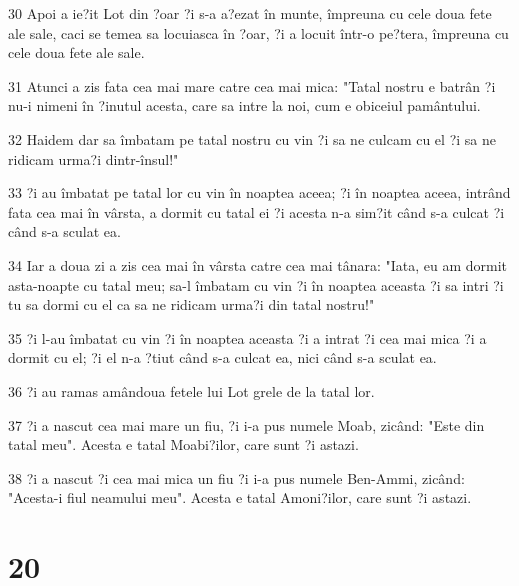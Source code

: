 \par 30 Apoi a ie?it Lot din ?oar ?i s-a a?ezat în munte, împreuna cu cele doua fete ale sale, caci se temea sa locuiasca în ?oar, ?i a locuit într-o pe?tera, împreuna cu cele doua fete ale sale.
\par 31 Atunci a zis fata cea mai mare catre cea mai mica: "Tatal nostru e batrân ?i nu-i nimeni în ?inutul acesta, care sa intre la noi, cum e obiceiul pamântului.
\par 32 Haidem dar sa îmbatam pe tatal nostru cu vin ?i sa ne culcam cu el ?i sa ne ridicam urma?i dintr-însul!"
\par 33 ?i au îmbatat pe tatal lor cu vin în noaptea aceea; ?i în noaptea aceea, intrând fata cea mai în vârsta, a dormit cu tatal ei ?i acesta n-a sim?it când s-a culcat ?i când s-a sculat ea.
\par 34 Iar a doua zi a zis cea mai în vârsta catre cea mai tânara: "Iata, eu am dormit asta-noapte cu tatal meu; sa-l îmbatam cu vin ?i în noaptea aceasta ?i sa intri ?i tu sa dormi cu el ca sa ne ridicam urma?i din tatal nostru!"
\par 35 ?i l-au îmbatat cu vin ?i în noaptea aceasta ?i a intrat ?i cea mai mica ?i a dormit cu el; ?i el n-a ?tiut când s-a culcat ea, nici când s-a sculat ea.
\par 36 ?i au ramas amândoua fetele lui Lot grele de la tatal lor.
\par 37 ?i a nascut cea mai mare un fiu, ?i i-a pus numele Moab, zicând: "Este din tatal meu". Acesta e tatal Moabi?ilor, care sunt ?i astazi.
\par 38 ?i a nascut ?i cea mai mica un fiu ?i i-a pus numele Ben-Ammi, zicând: "Acesta-i fiul neamului meu". Acesta e tatal Amoni?ilor, care sunt ?i astazi.

\chapter{20}

